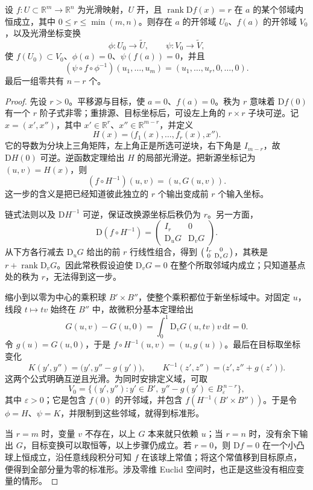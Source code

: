 \begin{theorem}[常秩定理]
	\label{g1:thm:constant-rank}
	设 \(f:U\subset\mathbb R^m\to\mathbb R^n\) 为光滑映射，\(U\) 开，且 \(\operatorname{rank}\mathrm{D}f(x)=r\) 在 \(a\) 的某个邻域内恒成立，其中 \(0\leq r\leq\min(m,n)\)。则存在 \(a\) 的开邻域 \(U_0\)、\(f(a)\) 的开邻域 \(V_0\)，以及光滑坐标变换
	\[
		\phi:U_0\longrightarrow\widetilde U,\qquad
		\psi:V_0\longrightarrow\widetilde V,
	\]
	使 \(f(U_0)\subset V_0\)、\(\phi(a)=0\)、\(\psi(f(a))=0\)，并且
	\begin{equation}
		\label{g1:eq:constant-rank-normal-form}
		(\psi\circ f\circ\phi^{-1})(u_1,\ldots,u_m)
		=(u_1,\ldots,u_r,0,\ldots,0).
	\end{equation}
	最后一组零共有 \(n-r\) 个。
\end{theorem}
\begin{proof}
	先设 \(r>0\)。平移源与目标，使 \(a=0\)、\(f(a)=0\)。秩为 \(r\) 意味着 \(\mathrm{D}f(0)\) 有一个 \(r\) 阶子式非零；重排源、目标坐标后，可设左上角的 \(r\times r\) 子块可逆。记 \(x=(x',x'')\)，其中 \(x'\in\mathbb R^r\)、\(x''\in\mathbb R^{m-r}\)，并定义
	\[
		H(x)=\bigl(f_1(x),\ldots,f_r(x),x''\bigr).
	\]
	它的导数为分块上三角矩阵，左上角正是所选可逆块，右下角是 \(I_{m-r}\)，故 \(\mathrm{D}H(0)\) 可逆。逆函数定理给出 \(H\) 的局部光滑逆。把新源坐标记为 \((u,v)=H(x)\)，则
	\[
		(f\circ H^{-1})(u,v)=(u,G(u,v)).
	\]
	这一步的含义是把已经知道彼此独立的 \(r\) 个输出变成前 \(r\) 个输入坐标。

	链式法则以及 \(\mathrm{D}H^{-1}\) 可逆，保证改换源坐标后秩仍为 \(r\)。另一方面，
	\[
		\mathrm{D}(f\circ H^{-1})
		=\begin{pmatrix}I_r&0\\\mathrm{D}_uG&\mathrm{D}_vG\end{pmatrix}.
	\]
	从下方各行减去 \(\mathrm{D}_uG\) 给出的前 \(r\) 行线性组合，得到 \(\begin{psmallmatrix}I_r&0\\0&\mathrm{D}_vG\end{psmallmatrix}\)，其秩是 \(r+\operatorname{rank}\mathrm{D}_vG\)。因此常秩假设迫使 \(\mathrm{D}_vG=0\) 在整个所取邻域内成立；只知道基点处的秩为 \(r\)，无法得到这一步。

	缩小到以零为中心的乘积球 \(B'\times B''\)，使整个乘积都位于新坐标域中。对固定 \(u\)，线段 \(t\mapsto tv\) 始终在 \(B''\) 中，故微积分基本定理给出
	\[
		G(u,v)-G(u,0)=\int_0^1\mathrm{D}_vG(u,tv)v\,\mathrm{d}t=0.
	\]
	令 \(g(u)=G(u,0)\)，于是 \(f\circ H^{-1}(u,v)=(u,g(u))\)。最后在目标取坐标变化
	\[
		K(y',y'')=\bigl(y',y''-g(y')\bigr),\qquad
		K^{-1}(z',z'')=\bigl(z',z''+g(z')\bigr).
	\]
	这两个公式明确互逆且光滑。为同时安排定义域，可取
	\[
		V_0=\{(y',y''):y'\in B',\ y''-g(y')\in B_\varepsilon^{\,n-r}\},
	\]
	其中 \(\varepsilon>0\)；它是包含 \(f(0)\) 的开邻域，并包含 \(f(H^{-1}(B'\times B''))\)。于是令 \(\phi=H\)、\(\psi=K\)，并限制到这些邻域，就得到标准形。

	当 \(r=m\) 时，变量 \(v\) 不存在，以上 \(G\) 本来就只依赖 \(u\)；当 \(r=n\) 时，没有余下输出 \(G\)，目标变换可以取恒等，以上步骤仍成立。若 \(r=0\)，则 \(\mathrm{D}f=0\) 在一个小凸球上恒成立，沿任意线段积分可知 \(f\) 在该球上常值；将这个常值移到目标原点，便得到全部分量为零的标准形。涉及零维 Euclid 空间时，也正是这些没有相应变量的情形。
\end{proof}

